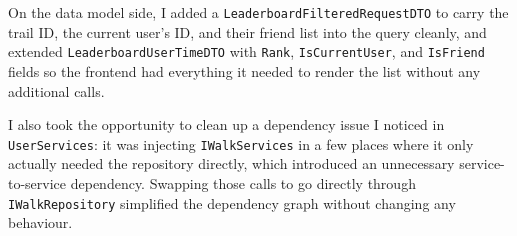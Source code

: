 On the data model side, I added a \texttt{LeaderboardFilteredRequestDTO} to carry the trail ID, the current user's ID, and their friend list into the query cleanly, and extended \texttt{LeaderboardUserTimeDTO} with \texttt{Rank}, \texttt{IsCurrentUser}, and \texttt{IsFriend} fields so the frontend had everything it needed to render the list without any additional calls.

I also took the opportunity to clean up a dependency issue I noticed in \texttt{UserServices}: it was injecting \texttt{IWalkServices} in a few places where it only actually needed the repository directly, which introduced an unnecessary service-to-service dependency. Swapping those calls to go directly through \texttt{IWalkRepository} simplified the dependency graph without changing any behaviour.